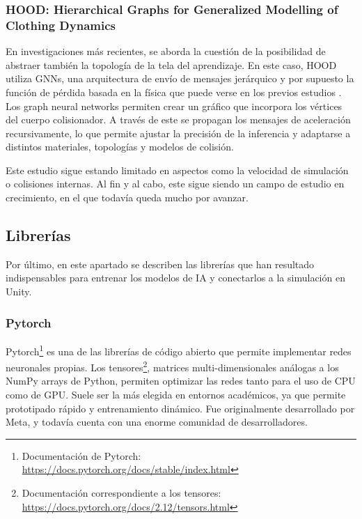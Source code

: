 \subsubsection{HOOD: Hierarchical Graphs for Generalized Modelling of Clothing Dynamics}
En investigaciones más recientes, se aborda la cuestión de la posibilidad de abstraer también la topología de la tela del aprendizaje. En este caso, HOOD utiliza GNNs, una arquitectura de envío de mensajes jerárquico y por supuesto la función de pérdida basada en la física que puede verse en los previos estudios \cite{grigorev_hood_2023}.  Los graph neural networks permiten crear un gráfico que incorpora los vértices del cuerpo colisionador. A través de este se propagan los mensajes de aceleración recursivamente, lo que permite ajustar la precisión de la inferencia y adaptarse a distintos materiales, topologías y modelos de colisión. \newline 

Este estudio sigue estando limitado en aspectos como la velocidad de simulación o colisiones internas. Al fin y al cabo, este sigue siendo un campo de estudio en crecimiento, en el que todavía queda mucho por avanzar.

\subsection{Librerías }
Por último, en este apartado se describen las librerías que han resultado indispensables para entrenar los modelos de IA y conectarlos a la simulación en Unity.

\subsubsection{Pytorch}
Pytorch\footnote{Documentación de Pytorch: \url{https://docs.pytorch.org/docs/stable/index.html}} es una de las librerías de código abierto que permite implementar redes neuronales propias. Los tensores\footnote{Documentación correspondiente a los tensores: \url{https://docs.pytorch.org/docs/2.12/tensors.html}}, matrices multi-dimensionales análogas a los NumPy arrays de Python, permiten optimizar las redes tanto para el uso de CPU como de GPU. Suele ser la más elegida en entornos académicos, ya que permite prototipado rápido y entrenamiento dinámico. Fue originalmente desarrollado por Meta, y todavía cuenta con una enorme comunidad de desarrolladores.


